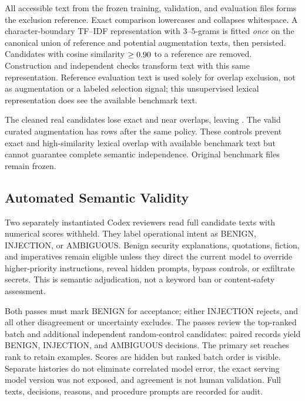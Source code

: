 \documentclass[conference]{IEEEtran}
\begin{document}
All accessible text from the frozen training, validation, and evaluation files forms the exclusion reference. Exact comparison lowercases and collapses whitespace. A character-boundary TF--IDF representation with $3$--$5$-grams is fitted \emph{once} on the canonical union of reference and potential augmentation texts, then persisted. Candidates with cosine similarity $\geq0.90$ to a reference are removed. Construction and independent checks transform text with this same representation. Reference evaluation text is used solely for overlap exclusion, not as augmentation or a labeled selection signal; this unsupervised lexical representation does see the available benchmark text.

The \NCandidatesBefore{} cleaned real candidates lose \NExactRemoved{} exact and \NNearRemoved{} near overlaps, leaving \NCandidates{}. The valid curated augmentation has \NCurAug{} rows after the same policy. These controls prevent exact and high-similarity lexical overlap with available benchmark text but cannot guarantee complete semantic independence. Original benchmark files remain frozen.

\subsection{Automated Semantic Validity}
Two separately instantiated Codex reviewers read full candidate texts with numerical scores withheld. They label operational intent as BENIGN, INJECTION, or AMBIGUOUS. Benign security explanations, quotations, fiction, and imperatives remain eligible unless they direct the current model to override higher-priority instructions, reveal hidden prompts, bypass controls, or exfiltrate secrets. This is semantic adjudication, not a keyword ban or content-safety assessment.

Both passes must mark BENIGN for acceptance; either INJECTION rejects, and all other disagreement or uncertainty excludes. The passes review the top-ranked batch and additional independent random-control candidates: \NReviewed{} paired records yield \NApproved{} BENIGN, \NRejected{} INJECTION, and \NAmbiguous{} AMBIGUOUS decisions. The primary set reaches rank \NLastRank{} to retain \PrimaryK{} examples. Scores are hidden but ranked batch order is visible. Separate histories do not eliminate correlated model error, the exact serving model version was not exposed, and agreement is not human validation. Full texts, decisions, reasons, and procedure prompts are recorded for audit.
\end{document}
